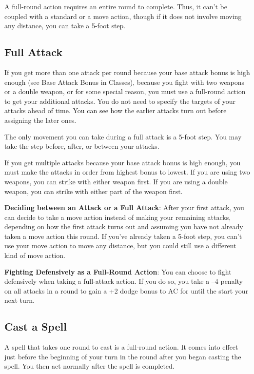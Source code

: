 				
A full-round action requires an entire round to complete. Thus, it can't be coupled with a standard or a move action, though if it does not involve moving any distance, you can take a 5-foot step.
				
\subsection{Full Attack}

				
If you get more than one attack per round because your base attack bonus is high enough (see Base Attack Bonus in Classes), because you fight with two weapons or a double weapon, or for some special reason, you must use a full-round action to get your additional attacks. You do not need to specify the targets of your attacks ahead of time. You can see how the earlier attacks turn out before assigning the later ones.
				
The only movement you can take during a full attack is a 5-foot step. You may take the step before, after, or between your attacks.
				
If you get multiple attacks because your base attack bonus is high enough, you must make the attacks in order from highest bonus to lowest. If you are using two weapons, you can strike with either weapon first. If you are using a double weapon, you can strike with either part of the weapon first.
				
\textbf{Deciding between an Attack or a Full Attack}: After your first attack, you can decide to take a move action instead of making your remaining attacks, depending on how the first attack turns out and assuming you have not already taken a move action this round. If you've already taken a 5-foot step, you can't use your move action to move any distance, but you could still use a different kind of move action.
				
\textbf{Fighting Defensively as a Full-Round Action}: You can choose to fight defensively when taking a full-attack action. If you do so, you take a --4 penalty on all attacks in a round to gain a +2 dodge bonus to AC for until the start your next turn.
				
\subsection{Cast a Spell}

				
A spell that takes one round to cast is a full-round action. It comes into effect just before the beginning of your turn in the round after you began casting the spell. You then act normally after the spell is completed.
				
